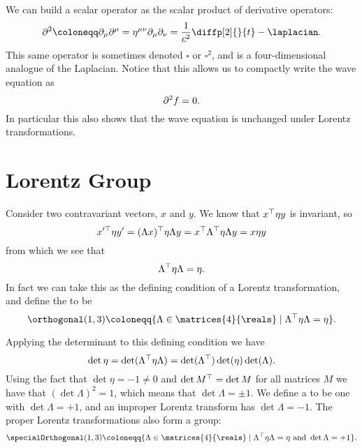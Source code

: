 We can build a scalar operator as the scalar product of derivative operators:
\begin{equation}
    \dalembertian \coloneqq \partial_\mu\partial^\mu = \eta^{\mu\nu}\partial_\mu\partial_\nu = \frac{1}{c^2}\diffp[2]{}{t} - \laplacian.
\end{equation}
This same operator is sometimes denoted \(\square\) or \(\square^2\), and is a four-dimensional analogue of the Laplacian.
Notice that this allows us to compactly write the wave equation as
\begin{equation}
    \partial^2 f = 0.
\end{equation}
In particular this also shows that the wave equation is unchanged under Lorentz transformations.

\section{Lorentz Group}
Consider two contravariant vectors, \(x\) and \(y\).
We know that \(x^\top \eta y\) is invariant, so
\begin{equation}
    x'^\top \eta y' = (\Lambda x)^\top \eta \Lambda y = x^\top \Lambda^\top \eta \Lambda y = x\eta y
\end{equation}
from which we see that
\begin{equation}
    \Lambda^\top \eta \Lambda = \eta.
\end{equation}
In fact we can take this as the defining condition of a Lorentz transformation, and define the  to be
\begin{equation}
    \orthogonal(1, 3) \coloneqq \{\Lambda \in \matrices{4}{\reals} \mid \Lambda^\trans \eta \Lambda = \eta\}.
\end{equation}

Applying the determinant to this defining condition we have
\begin{equation}
    \det \eta = \det(\Lambda^\top \eta \Lambda) = \det(\Lambda^\top) \det(\eta) \det(\Lambda).
\end{equation}
Using the fact that \(\det \eta = -1 \ne 0\) and \(\det M^\top = \det M\) for all matrices \(M\) we have that \((\det\Lambda)^2 = 1\), which means that \(\det\Lambda = \pm 1\).
We define a  to be one with \(\det \Lambda = +1\), and an improper Lorentz transform has \(\det\Lambda = -1\).
The proper Lorentz transformations also form a group:
\begin{equation}
    \specialOrthogonal(1, 3) \coloneqq \{\Lambda \in \matrices{4}{\reals} \mid \Lambda^\trans \eta \Lambda = \eta \text{ and } \det \Lambda = +1\}.
\end{equation}

